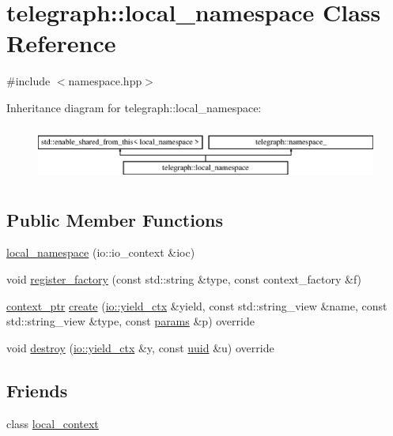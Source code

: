 \hypertarget{classtelegraph_1_1local__namespace}{}\section{telegraph\+:\+:local\+\_\+namespace Class Reference}
\label{classtelegraph_1_1local__namespace}


{\ttfamily \#include $<$namespace.\+hpp$>$}

Inheritance diagram for telegraph\+:\+:local\+\_\+namespace\+:\begin{figure}[H]
\begin{center}
\leavevmode
\includegraphics[height=1.830065cm]{classtelegraph_1_1local__namespace}
\end{center}
\end{figure}
\subsection*{Public Member Functions}
\begin{DoxyCompactItemize}
\item 
\hyperlink{classtelegraph_1_1local__namespace_ace7dfdc615015182df5aa9a542833858}{local\+\_\+namespace} (io\+::io\+\_\+context \&ioc)
\item 
void \hyperlink{classtelegraph_1_1local__namespace_a5b322511c2e72c889bcb7ffb5d271d26}{register\+\_\+factory} (const std\+::string \&type, const context\+\_\+factory \&f)
\item 
\hyperlink{namespacetelegraph_a332e681f0d44a1308cf3a013a9dd140f}{context\+\_\+ptr} \hyperlink{classtelegraph_1_1local__namespace_a5ebe002275408c950d8fd44b829434e4}{create} (\hyperlink{structboost_1_1asio_1_1yield__ctx}{io\+::yield\+\_\+ctx} \&yield, const std\+::string\+\_\+view \&name, const std\+::string\+\_\+view \&type, const \hyperlink{classtelegraph_1_1params}{params} \&p) override
\item 
void \hyperlink{classtelegraph_1_1local__namespace_aae3c0b770ea3bd29b1e4dfac7cfd805f}{destroy} (\hyperlink{structboost_1_1asio_1_1yield__ctx}{io\+::yield\+\_\+ctx} \&y, const \hyperlink{namespacetelegraph_a51ee91d7eaeef067f7ccac2b170e5d59}{uuid} \&u) override
\end{DoxyCompactItemize}
\subsection*{Friends}
\begin{DoxyCompactItemize}
\item 
class \hyperlink{classtelegraph_1_1local__namespace_a847a7b7b99bad0f0d4efbbc115fd61f5}{local\+\_\+context}
\end{DoxyCompactItemize}

